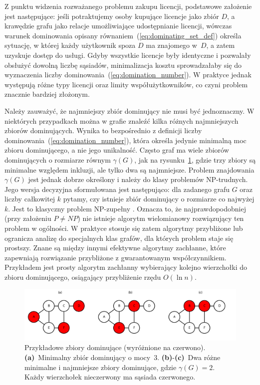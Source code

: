 Z punktu widzenia rozważanego problemu zakupu licencji, podstawowe założenie jest następujące:
jeśli potraktujemy osoby kupujące licencje jako zbiór \(D\), a krawędzie grafu jako relacje
umożliwiające udostępnianie licencji, wówczas warunek dominowania opisany równaniem~(\ref{eq:dominating_set_def}) określa sytuację,
w której każdy użytkownik spoza $D$ ma znajomego w~$D$, a zatem uzyskuje dostęp do usługi.
Gdyby wszystkie licencje były identyczne i pozwalały obsłużyć dowolną liczbę sąsiadów,
minimalizacja kosztu sprowadzałaby się do wyznaczenia liczby dominowania~(\ref{eq:domination_number}).
W praktyce jednak występują różne typy licencji oraz limity
współużytkowników, co czyni problem znacznie bardziej złożonym.

Należy zauważyć, że najmniejszy zbiór dominujący nie musi być jednoznaczny.
W niektórych przypadkach można w grafie znaleźć kilka różnych najmniejszych zbiorów dominujących.
Wynika to bezpośrednio z definicji liczby dominowania~(\ref{eq:domination_number}),
która określa jedynie minimalną moc zbioru dominującego, a nie jego unikalność.
Często graf ma wiele zbiorów dominujących o rozmiarze równym $\gamma(G)$,
jak na rysunku~\ref{fig:dominatingexample}, gdzie trzy zbiory są minimalne względem inkluzji, ale tylko dwa są najmniejsze.
Problem znajdowania $\gamma(G)$ jest jednak dobrze określony i należy do klasy problemów NP-trudnych. Jego wersja decyzyjna sformułowana jest następująco: dla zadanego grafu $G$ oraz liczby całkowitej $k$ pytamy, czy istnieje zbiór dominujący o rozmiarze co najwyżej $k$. Jest to klasyczny problem NP-zupełny \cite{wikiDominatingSet, POUREIDI2023106363, PANDA2023337}. Oznacza to, że najprawdopodobniej (przy założeniu $P \neq NP$) nie istnieje algorytm wielomianowy rozwiązujący ten problem w ogólności. W praktyce stosuje się zatem algorytmy przybliżone lub ogranicza analizę do specjalnych klas grafów, dla których problem staje się prostszy. Znane są między innymi efektywne algorytmy zachłanne, które zapewniają rozwiązanie przybliżone z gwarantowanym współczynnikiem. Przykładem jest prosty algorytm zachłanny wybierający kolejno wierzchołki do zbioru dominującego, osiągający przybliżenie rzędu $O(\ln n)$.


\begin{figure}[H]
  \centering
  \includegraphics[width=1\textwidth]{assets/dominating-set-example.png}
  \caption[Przykładowe zbiory dominujące]{%
    Przykładowe zbiory dominujące (wyróżnione na czerwono).
    \textbf{(a)}~Minimalny zbiór dominujący o mocy~3.
    \textbf{(b)}-\textbf{(c)}~Dwa różne minimalne i najmniejsze zbiory dominujące, gdzie
    \(\gamma(G)=2\).  Każdy wierzchołek nieczerwony ma sąsiada czerwonego.
  }
  \label{fig:dominatingexample}
\end{figure}

